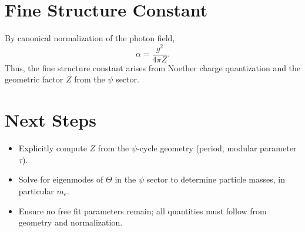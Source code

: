 \documentclass[12pt]{article}
\begin{document}
\section{Fine Structure Constant}
By canonical normalization of the photon field,
\begin{equation}
\alpha = \frac{g^2}{4\pi Z}.
\end{equation}
Thus, the fine structure constant arises from Noether charge quantization and the geometric factor $Z$ from the $\psi$ sector.

\section{Next Steps}
\begin{itemize}
\item Explicitly compute $Z$ from the $\psi$-cycle geometry (period, modular parameter $\tau$).
\item Solve for eigenmodes of $\Theta$ in the $\psi$ sector to determine particle masses, in particular $m_e$.
\item Ensure no free fit parameters remain; all quantities must follow from geometry and normalization.
\end{itemize}
\end{document}
